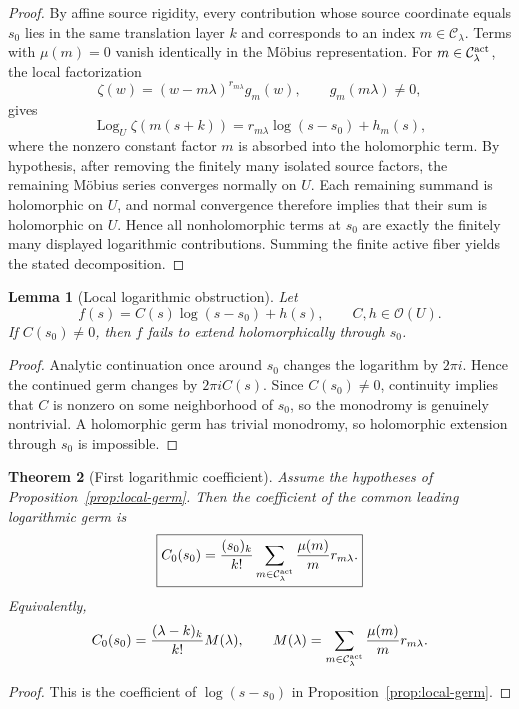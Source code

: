 \documentclass[11pt]{article}
\newtheorem{theorem}{Theorem}[section]
\newtheorem{lemma}[theorem]{Lemma}
\theoremstyle{definition}
\newcommand{\C}{\mathcal C}
\newcommand{\Ocal}{\mathcal O}
\newcommand{\Logz}{\operatorname{Log}}
\begin{document}
\begin{proof}
By affine source rigidity, every contribution whose source coordinate equals $s_0$ lies in the same translation layer $k$ and corresponds to an index $m\in\C_\lambda$. Terms with $\mu(m)=0$ vanish identically in the Möbius representation. For $m\in\C_\lambda^{\rm act}$, the local factorization
\[
\zeta(w)=(w-m\lambda)^{r_{m\lambda}}g_m(w),
\qquad g_m(m\lambda)\ne0,
\]
gives
\[
\Logz_U\zeta(m(s+k))
=r_{m\lambda}\log(s-s_0)+h_m(s),
\]
where the nonzero constant factor $m$ is absorbed into the holomorphic term. By hypothesis, after removing the finitely many isolated source factors, the remaining Möbius series converges normally on $U$. Each remaining summand is holomorphic on $U$, and normal convergence therefore implies that their sum is holomorphic on $U$. Hence all nonholomorphic terms at $s_0$ are exactly the finitely many displayed logarithmic contributions. Summing the finite active fiber yields the stated decomposition.
\end{proof}

\begin{lemma}[Local logarithmic obstruction]
\label{lem:monodromy}
Let
\[
f(s)=C(s)\log(s-s_0)+h(s),
\qquad C,h\in\Ocal(U).
\]
If $C(s_0)\ne0$, then $f$ fails to extend holomorphically through $s_0$.
\end{lemma}

\begin{proof}
Analytic continuation once around $s_0$ changes the logarithm by $2\pi i$. Hence the continued germ changes by $2\pi i C(s)$. Since $C(s_0)\ne0$, continuity implies that $C$ is nonzero on some neighborhood of $s_0$, so the monodromy is genuinely nontrivial. A holomorphic germ has trivial monodromy, so holomorphic extension through $s_0$ is impossible.
\end{proof}

\begin{theorem}[First logarithmic coefficient]
\label{thm:leading}
Assume the hypotheses of Proposition~\ref{prop:local-germ}. Then the coefficient of the common leading logarithmic germ is
\[
\boxed{
C_0(s_0)
=
\frac{(s_0)_k}{k!}
\sum_{m\in\C_\lambda^{\rm act}}
\frac{\mu(m)}m r_{m\lambda}.
}
\]
Equivalently,
\[
C_0(s_0)=\frac{(\lambda-k)_k}{k!}M(\lambda),
\qquad
M(\lambda)=\sum_{m\in\C_\lambda^{\rm act}}\frac{\mu(m)}m r_{m\lambda}.
\]
\end{theorem}

\begin{proof}
This is the coefficient of $\log(s-s_0)$ in Proposition~\ref{prop:local-germ}.
\end{proof}
\end{document}
